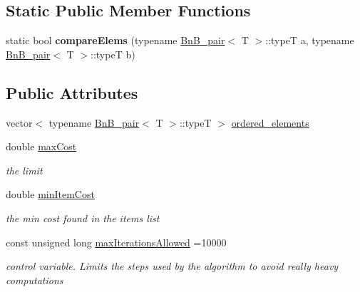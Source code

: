 \subsection*{Static Public Member Functions}
\begin{DoxyCompactItemize}
\item 
\hypertarget{class_bn_b___u_p_a17570dfb1185be4ab8d1e651b7064ea5}{}static bool {\bfseries compare\+Elems} (typename \hyperlink{struct_bn_b__pair}{Bn\+B\+\_\+pair}$<$ T $>$\+::type\+T a, typename \hyperlink{struct_bn_b__pair}{Bn\+B\+\_\+pair}$<$ T $>$\+::type\+T b)\label{class_bn_b___u_p_a17570dfb1185be4ab8d1e651b7064ea5}

\end{DoxyCompactItemize}
\subsection*{Public Attributes}
\begin{DoxyCompactItemize}
\item 
vector$<$ typename \hyperlink{struct_bn_b__pair}{Bn\+B\+\_\+pair}$<$ T $>$\+::type\+T $>$ \hyperlink{class_bn_b___u_p_a8308ba99698255a402675713b1ac6cb0}{ordered\+\_\+elements}
\item 
\hypertarget{class_bn_b___u_p_a0749a907c11c880f825fd0644a8a2bfd}{}double \hyperlink{class_bn_b___u_p_a0749a907c11c880f825fd0644a8a2bfd}{max\+Cost}\label{class_bn_b___u_p_a0749a907c11c880f825fd0644a8a2bfd}

\begin{DoxyCompactList}\small\item\em the limit \end{DoxyCompactList}\item 
\hypertarget{class_bn_b___u_p_ae5fdb19ab49f1e0dc93700a42c5884f9}{}double \hyperlink{class_bn_b___u_p_ae5fdb19ab49f1e0dc93700a42c5884f9}{min\+Item\+Cost}\label{class_bn_b___u_p_ae5fdb19ab49f1e0dc93700a42c5884f9}

\begin{DoxyCompactList}\small\item\em the min cost found in the items list \end{DoxyCompactList}\item 
\hypertarget{class_bn_b___u_p_a05b18af61820e672cff387958b393949}{}const unsigned long \hyperlink{class_bn_b___u_p_a05b18af61820e672cff387958b393949}{max\+Iterations\+Allowed} =10000\label{class_bn_b___u_p_a05b18af61820e672cff387958b393949}

\begin{DoxyCompactList}\small\item\em control variable. Limits the steps used by the algorithm to avoid really heavy computations \end{DoxyCompactList}\end{DoxyCompactItemize}
